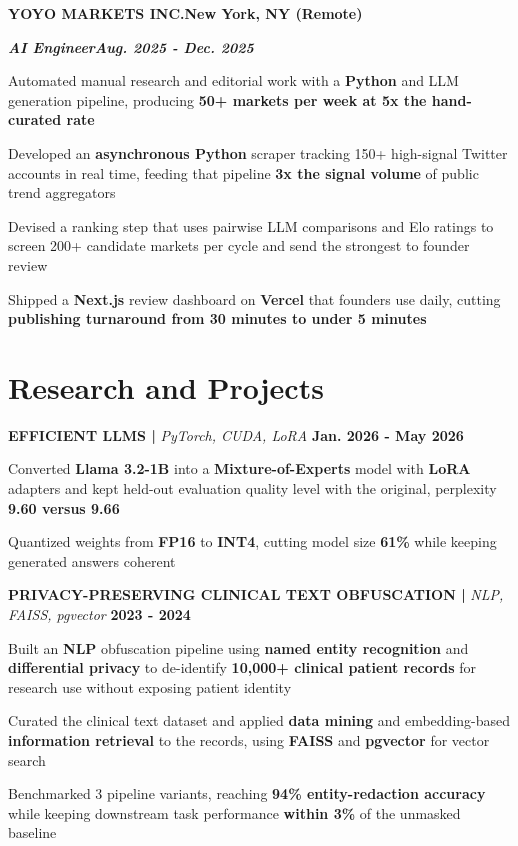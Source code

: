 \documentclass[10pt]{article}
\newcommand{\job}[4]{%
  \vspace{0pt}%
  \textbf{\MakeUppercase{#1}}\hfill\textbf{#2}\par
  \vspace{0.5pt}%
  \textbf{\textit{#3}}\hfill\textbf{\textit{#4}}\par
}
\newcommand{\proj}[4]{%
  \vspace{3pt}%
  \textbf{\MakeUppercase{#1} | }\textit{#2}\hfill
  \textbf{#4}%
  \notblank{#3}{\ \textbf{| #3}}{}%
  \par
}
\begin{document}
\vspace{3pt}
\job{Yoyo Markets Inc.}{New York, NY (Remote)}{AI Engineer}{Aug. 2025 - Dec. 2025}
\begin{bullets}
  \item Automated manual research and editorial work with a \textbf{Python} and LLM generation pipeline, producing \textbf{50+ markets per week at 5x the hand-curated rate}
  \item Developed an \textbf{asynchronous Python} scraper tracking 150+ high-signal Twitter accounts in real time, feeding that pipeline \textbf{3x the signal volume} of public trend aggregators
  \item Devised a ranking step that uses pairwise LLM comparisons and Elo ratings to screen 200+ candidate markets per cycle and send the strongest to founder review
  \item Shipped a \textbf{Next.js} review dashboard on \textbf{Vercel} that founders use daily, cutting \textbf{publishing turnaround from 30 minutes to under 5 minutes}
\end{bullets}

\section{Research and Projects}
\vspace{-3pt}
\proj{Efficient LLMs}{PyTorch, CUDA, LoRA}{USC}{Jan. 2026 - May 2026}
\begin{bullets}
  \item Converted \textbf{Llama 3.2-1B} into a \textbf{Mixture-of-Experts} model with \textbf{LoRA} adapters and kept held-out evaluation quality level with the original, perplexity \textbf{9.60 versus 9.66}
  \item Quantized weights from \textbf{FP16} to \textbf{INT4}, cutting model size \textbf{61\%} while keeping generated answers coherent
\end{bullets}

\proj{Privacy-Preserving Clinical Text Obfuscation}{NLP, FAISS, pgvector}{UMich SOCR Lab}{2023 - 2024}
\begin{bullets}
  \item Built an \textbf{NLP} obfuscation pipeline using \textbf{named entity recognition} and \textbf{differential privacy} to de-identify \textbf{10,000+ clinical patient records} for research use without exposing patient identity
  \item Curated the clinical text dataset and applied \textbf{data mining} and embedding-based \textbf{information retrieval} to the records, using \textbf{FAISS} and \textbf{pgvector} for vector search
  \item Benchmarked 3 pipeline variants, reaching \textbf{94\% entity-redaction accuracy} while keeping downstream task performance \textbf{within 3\%} of the unmasked baseline
\end{bullets}
\end{document}
